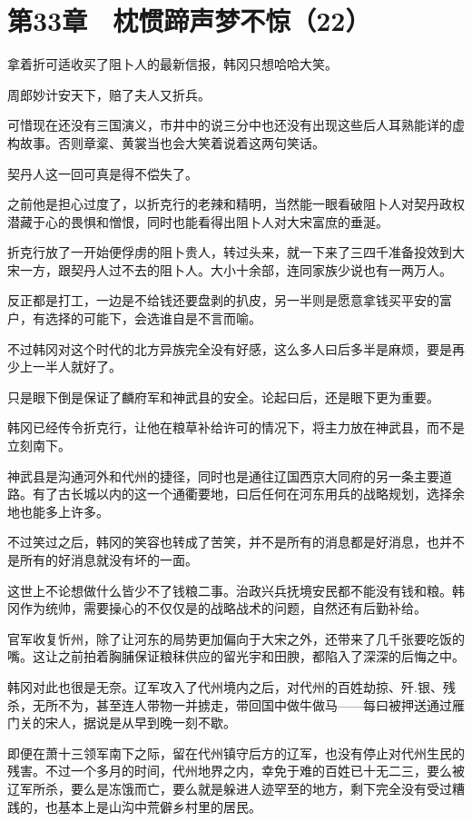 \section{第33章　枕惯蹄声梦不惊（22）}

拿着折可适收买了阻卜人的最新信报，韩冈只想哈哈大笑。

周郎妙计安天下，赔了夫人又折兵。

可惜现在还没有三国演义，市井中的说三分中也还没有出现这些后人耳熟能详的虚构故事。否则章楶、黄裳当也会大笑着说着这两句笑话。

契丹人这一回可真是得不偿失了。

之前他是担心过度了，以折克行的老辣和精明，当然能一眼看破阻卜人对契丹政权潜藏于心的畏惧和憎恨，同时也能看得出阻卜人对大宋富庶的垂涎。

折克行放了一开始便俘虏的阻卜贵人，转过头来，就一下来了三四千准备投效到大宋一方，跟契丹人过不去的阻卜人。大小十余部，连同家族少说也有一两万人。

反正都是打工，一边是不给钱还要盘剥的扒皮，另一半则是愿意拿钱买平安的富户，有选择的可能下，会选谁自是不言而喻。

不过韩冈对这个时代的北方异族完全没有好感，这么多人曰后多半是麻烦，要是再少上一半人就好了。

只是眼下倒是保证了麟府军和神武县的安全。论起曰后，还是眼下更为重要。

韩冈已经传令折克行，让他在粮草补给许可的情况下，将主力放在神武县，而不是立刻南下。

神武县是沟通河外和代州的捷径，同时也是通往辽国西京大同府的另一条主要道路。有了古长城以内的这一个通衢要地，曰后任何在河东用兵的战略规划，选择余地也能多上许多。

不过笑过之后，韩冈的笑容也转成了苦笑，并不是所有的消息都是好消息，也并不是所有的好消息就没有坏的一面。

这世上不论想做什么皆少不了钱粮二事。治政兴兵抚境安民都不能没有钱和粮。韩冈作为统帅，需要操心的不仅仅是的战略战术的问题，自然还有后勤补给。

官军收复忻州，除了让河东的局势更加偏向于大宋之外，还带来了几千张要吃饭的嘴。这让之前拍着胸脯保证粮秣供应的留光宇和田腴，都陷入了深深的后悔之中。

韩冈对此也很是无奈。辽军攻入了代州境内之后，对代州的百姓劫掠、歼.银、残杀，无所不为，甚至连人带物一并掳走，带回国中做牛做马——每曰被押送通过雁门关的宋人，据说是从早到晚一刻不歇。

即便在萧十三领军南下之际，留在代州镇守后方的辽军，也没有停止对代州生民的残害。不过一个多月的时间，代州地界之内，幸免于难的百姓已十无二三，要么被辽军所杀，要么是冻饿而亡，要么就是躲进人迹罕至的地方，剩下完全没有受过糟践的，也基本上是山沟中荒僻乡村里的居民。

